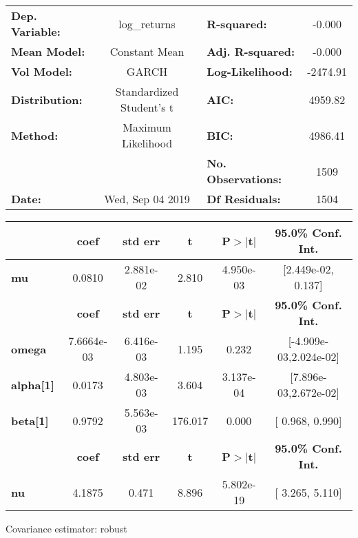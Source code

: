 \begin{center}
\begin{tabular}{lclc}
\toprule
\textbf{Dep. Variable:} &       log\_returns       & \textbf{  R-squared:         } &    -0.000   \\
\textbf{Mean Model:}    &      Constant Mean       & \textbf{  Adj. R-squared:    } &    -0.000   \\
\textbf{Vol Model:}     &          GARCH           & \textbf{  Log-Likelihood:    } &   -2474.91  \\
\textbf{Distribution:}  & Standardized Student's t & \textbf{  AIC:               } &    4959.82  \\
\textbf{Method:}        &    Maximum Likelihood    & \textbf{  BIC:               } &    4986.41  \\
\textbf{}               &                          & \textbf{  No. Observations:  } &    1509     \\
\textbf{Date:}          &     Wed, Sep 04 2019     & \textbf{  Df Residuals:      } &    1504     \\
\bottomrule
\end{tabular}
\begin{tabular}{lccccc}
            & \textbf{coef} & \textbf{std err} & \textbf{t} & \textbf{P$> |$t$|$} & \textbf{95.0\% Conf. Int.}  \\
\midrule
\textbf{mu} &       0.0810  &    2.881e-02     &     2.810  &      4.950e-03       &    [2.449e-02,  0.137]      \\
                  & \textbf{coef} & \textbf{std err} & \textbf{t} & \textbf{P$> |$t$|$} & \textbf{95.0\% Conf. Int.}  \\
\midrule
\textbf{omega}    &   7.6664e-03  &    6.416e-03     &     1.195  &          0.232       &   [-4.909e-03,2.024e-02]    \\
\textbf{alpha[1]} &       0.0173  &    4.803e-03     &     3.604  &      3.137e-04       &   [7.896e-03,2.672e-02]     \\
\textbf{beta[1]}  &       0.9792  &    5.563e-03     &   176.017  &        0.000         &     [  0.968,  0.990]       \\
            & \textbf{coef} & \textbf{std err} & \textbf{t} & \textbf{P$> |$t$|$} & \textbf{95.0\% Conf. Int.}  \\
\midrule
\textbf{nu} &       4.1875  &        0.471     &     8.896  &      5.802e-19       &     [  3.265,  5.110]       \\
\bottomrule
\end{tabular}
\end{center}

Covariance estimator: robust
